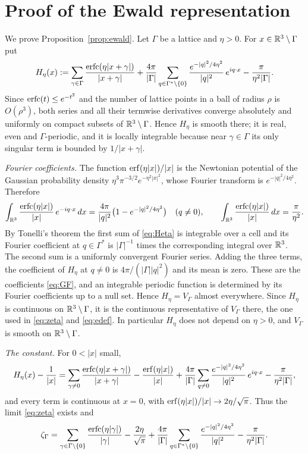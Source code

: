 \section{Proof of the Ewald representation}\label{app:ewald}

We prove Proposition~\ref{prop:ewald}. Let $\Gamma$ be a lattice and $\eta>0$. For $x\in\mathbb R^3\setminus\Gamma$ put
\begin{equation}\label{eq:Heta}
  H_\eta(x):=\sum_{\gamma\in\Gamma}\frac{\operatorname{erfc}(\eta|x+\gamma|)}{|x+\gamma|}
     +\frac{4\pi}{|\Gamma|}\sum_{q\in\Gamma^*\setminus\{0\}}\frac{e^{-|q|^2/4\eta^2}}{|q|^2}\,e^{iq\cdot x}-\frac{\pi}{\eta^2|\Gamma|}.
\end{equation}
Since $\operatorname{erfc}(t)\le e^{-t^2}$ and the number of lattice points in a ball of radius $\rho$ is $O(\rho^3)$, both series and all their
termwise derivatives converge absolutely and uniformly on compact subsets of $\mathbb R^3\setminus\Gamma$. Hence $H_\eta$ is smooth there; it is
real, even and $\Gamma$-periodic, and it is locally integrable because near $\gamma\in\Gamma$ its only singular term is bounded by
$1/|x+\gamma|$.

\emph{Fourier coefficients.} The function $\operatorname{erf}(\eta|x|)/|x|$ is the Newtonian potential of the Gaussian probability density
$\eta^3\pi^{-3/2}e^{-\eta^2|x|^2}$, whose Fourier transform is $e^{-|q|^2/4\eta^2}$. Therefore
\[
  \int_{\mathbb R^3}\frac{\operatorname{erfc}(\eta|x|)}{|x|}\,e^{-iq\cdot x}\,dx=\frac{4\pi}{|q|^2}\bigl(1-e^{-|q|^2/4\eta^2}\bigr)\quad(q\ne0),\qquad
  \int_{\mathbb R^3}\frac{\operatorname{erfc}(\eta|x|)}{|x|}\,dx=\frac\pi{\eta^2}.
\]
By Tonelli's theorem the first sum of \eqref{eq:Heta} is integrable over a cell and its Fourier coefficient at $q\in\Gamma^*$ is
$|\Gamma|^{-1}$ times the corresponding integral over $\mathbb R^3$. The second sum is a uniformly convergent Fourier series. Adding the three
terms, the coefficient of $H_\eta$ at $q\ne0$ is $4\pi/(|\Gamma||q|^2)$ and its mean is zero. These are the coefficients \eqref{eq:GF}, and
an integrable periodic function is determined by its Fourier coefficients up to a null set. Hence $H_\eta=V_\Gamma$ almost everywhere.
Since $H_\eta$ is continuous on $\mathbb R^3\setminus\Gamma$, it is the continuous representative of $V_\Gamma$ there, the one used in
\eqref{eq:zeta} and \eqref{eq:edef}. In particular $H_\eta$ does not depend on $\eta>0$, and $V_\Gamma$ is smooth on
$\mathbb R^3\setminus\Gamma$.

\emph{The constant.} For $0<|x|$ small,
\[
  H_\eta(x)-\frac1{|x|}=\sum_{\gamma\ne0}\frac{\operatorname{erfc}(\eta|x+\gamma|)}{|x+\gamma|}-\frac{\operatorname{erf}(\eta|x|)}{|x|}
   +\frac{4\pi}{|\Gamma|}\sum_{q\ne0}\frac{e^{-|q|^2/4\eta^2}}{|q|^2}\,e^{iq\cdot x}-\frac{\pi}{\eta^2|\Gamma|},
\]
and every term is continuous at $x=0$, with $\operatorname{erf}(\eta|x|)/|x|\to2\eta/\sqrt\pi$. Thus the limit \eqref{eq:zeta} exists and
\begin{equation}\label{eq:zetaE}
  \zeta_\Gamma=\sum_{\gamma\in\Gamma\setminus\{0\}}\frac{\operatorname{erfc}(\eta|\gamma|)}{|\gamma|}-\frac{2\eta}{\sqrt\pi}
   +\frac{4\pi}{|\Gamma|}\sum_{q\in\Gamma^*\setminus\{0\}}\frac{e^{-|q|^2/4\eta^2}}{|q|^2}-\frac{\pi}{\eta^2|\Gamma|}.
\end{equation}

